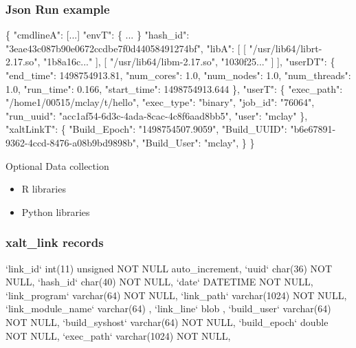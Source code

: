 \documentclass{beamer}
\begin{document}
\begin{frame}[fragile]
    \frametitle{Json Run example}
    {\tiny
\begin{semiverbatim}
\{
    "cmdlineA": [...]
    "envT": \{ ... \}
    "hash_id": "3eae43c087b90e0672ccdbe7f0d44058491274bf",
    "libA": [
        [ "/usr/lib64/librt-2.17.so", "1b8a16c..."  ],
        [ "/usr/lib64/libm-2.17.so",  "1030f25..."  ]
    ],
    "userDT": \{
        "end_time": 1498754913.81,
        "num_cores": 1.0,
        "num_nodes": 1.0,
        "num_threads": 1.0,
        "run_time": 0.166,
        "start_time": 1498754913.644
    \},
    "userT": \{
        "exec_path": "/home1/00515/mclay/t/hello",
        "exec_type": "binary",
        "job_id": "76064",
        "run_uuid": "acc1af54-6d3c-4ada-8cac-4c8f6aad8bb5",
        "user": "mclay"
    \},
    "xaltLinkT": \{
        "Build_Epoch": "1498754507.9059",
        "Build_UUID": "b6e67891-9362-4ccd-8476-a08b9bd9898b",
        "Build_User": "mclay",
    \}
\}
\end{semiverbatim}
    }
\end{frame}

\begin{frame}{Optional Data collection}
  \begin{itemize}
    \item R libraries
    \item Python libraries
  \end{itemize}
\end{frame}

\begin{frame}[fragile]
    \frametitle{xalt\_link records}
    {\tiny
\begin{semiverbatim}
  `link\_id`          int(11)   unsigned NOT NULL auto\_increment,
  `uuid`             char(36)           NOT NULL,
  `hash\_id`          char(40)           NOT NULL,
  `date`             DATETIME           NOT NULL,
  `link\_program`     varchar(64)        NOT NULL,
  `link\_path`        varchar(1024)      NOT NULL,
  `link\_module\_name` varchar(64)                ,
  `link\_line`        blob                       ,
  `build\_user`       varchar(64)        NOT NULL,
  `build\_syshost`    varchar(64)        NOT NULL,
  `build\_epoch`      double             NOT NULL,
  `exec\_path`        varchar(1024)      NOT NULL,
\end{semiverbatim}
    }
\end{frame}
\end{document}
